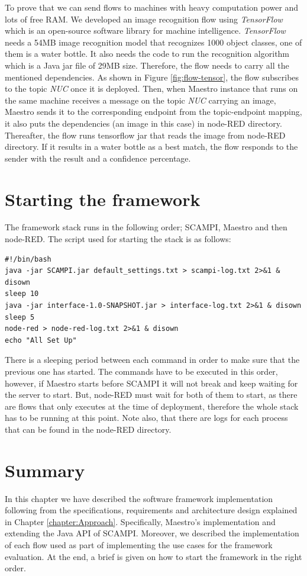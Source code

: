 To prove that we can send flows to machines with heavy computation power and lots of free RAM. We developed an image recognition flow using \textit{TensorFlow} which is an open-source software library for machine intelligence. \textit{TensorFlow} needs a 54MB image recognition model that recognizes 1000 object classes, one of them is a water bottle. It also needs the code to run the recognition algorithm which is a Java jar file of 29MB size. Therefore, the flow  needs to carry all the mentioned dependencies. As shown in Figure \ref{fig:flow-tensor}, the flow subscribes to the topic \textit{NUC} once it is deployed. Then, when Maestro instance that runs on the same machine receives a message on the topic \textit{NUC} carrying an image, Maestro sends it to the corresponding endpoint  from the topic-endpoint mapping, it also puts the dependencies (an image in this case) in node-RED directory. Thereafter, the flow runs tensorflow jar that reads the image from  node-RED directory. If it results in a water bottle as a best match, the flow responds to the sender with the result and a confidence percentage.

\section{Starting the framework}\label{subsec:starting-framework}

The framework stack runs in the following order; SCAMPI, Maestro and then node-RED. The script used for starting the stack is as follows:
\begin{verbatim}
#!/bin/bash
java -jar SCAMPI.jar default_settings.txt > scampi-log.txt 2>&1 & disown
sleep 10
java -jar interface-1.0-SNAPSHOT.jar > interface-log.txt 2>&1 & disown
sleep 5
node-red > node-red-log.txt 2>&1 & disown
echo "All Set Up"
\end{verbatim}
There is a sleeping period between each command in order to make sure that the previous one has started. The commands have to be executed in this order, however, if Maestro starts before SCAMPI it will not break and keep waiting for the server to start. But, node-RED must wait for both of them to start, as there are flows that only executes at the time of deployment, therefore the whole stack has to be running at this point. Note also, that there are logs for each process that can be found in the node-RED directory. 


\section{Summary}

In this chapter we have described the software framework implementation following from the specifications, requirements and architecture design explained in Chapter \ref{chapter:Approach}. Specifically, Maestro's implementation and extending the Java API of SCAMPI. Moreover, we described the implementation of each flow used as part of implementing the use cases for the framework evaluation. At the end,  a brief is given on how to start the framework in the right order.